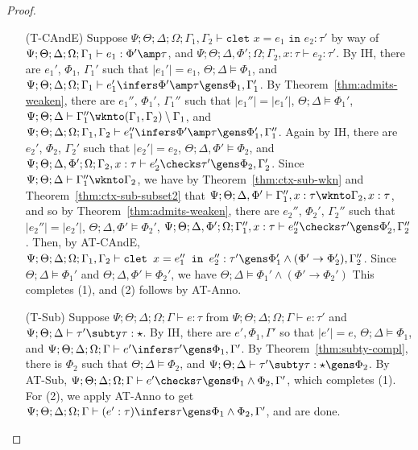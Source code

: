 \begin{proof}
\begin{itemize}
  \item[(T-CAndE)] Suppose
  $\Psi ; \Theta ; \Delta ; \Omega ; \Gamma_1,\Gamma_2 \vdash \texttt{clet } x = e_1 \texttt{ in } e_2 : \tau'$ by way of
  $\Psi ; \Theta ; \Delta ; \Omega ; \Gamma_1 \vdash e_1 : \Phi' \amp \tau$, and
  $\Psi ; \Theta ; \Delta, \Phi' ; \Omega ; \Gamma_2, x : \tau \vdash e_2 : \tau'$.
  By IH, there are $e_1'$, $\Phi_1$, $\Gamma_1'$ such that
  $|e_1'| = e_1$,
  $\Theta ; \Delta \vDash \Phi_1$, and
  $\Psi ; \Theta ; \Delta ; \Omega ; \Gamma_1 \vdash e_1' \infers \Phi' \amp \tau \gens \Phi_1,\Gamma_1'$.
  By Theorem~\ref{thm:admits-weaken}, there are $e_1''$, $\Phi_1'$, $\Gamma_1''$ such that
  $|e_1''| = |e_1'|$,
  $\Theta ; \Delta \vDash \Phi_1'$,
  $\Psi ; \Theta ; \Delta \vdash \Gamma_1'' \wknto (\Gamma_1,\Gamma_2) \setminus \Gamma_1$, and
  $\Psi ; \Theta ; \Delta ; \Omega ; \Gamma_1,\Gamma_2 \vdash e_1'' \infers \Phi' \amp \tau \gens \Phi_1',\Gamma_1''$.
  Again by IH, there are $e_2'$, $\Phi_2$, $\Gamma_2'$ such that
  $|e_2'| = e_2$,
  $\Theta ; \Delta,\Phi' \vDash \Phi_2$, and
  $\Psi ; \Theta ; \Delta,\Phi' ; \Omega ; \Gamma_2,x : \tau \vdash e_2' \checks \tau' \gens \Phi_2,\Gamma_2'$.
  Since
  $\Psi ; \Theta ; \Delta \vdash \Gamma_1'' \wknto \Gamma_2$, we have by Theorem~\ref{thm:ctx-sub-wkn} and Theorem~\ref{thm:ctx-sub-subset2}
  that
  $\Psi ; \Theta ; \Delta,\Phi' \vdash \Gamma_1'',x : \tau \wknto \Gamma_2,x : \tau$,
  and so by Theorem~\ref{thm:admits-weaken}, there are $e_2''$, $\Phi_2'$, $\Gamma_2''$ such that
  $|e_2''| = |e_2'|$,
  $\Theta ; \Delta, \Phi' \vDash \Phi_2'$,
  $\Psi ; \Theta ; \Delta, \Phi' ; \Omega ;\Gamma_1'',x:\tau \vdash e_2'' \checks \tau' \gens \Phi_2',\Gamma_2''$.
  Then, by AT-CAndE,
  $\Psi ; \Theta ; \Delta ; \Omega ; \Gamma_1,\Gamma_2 \vdash \texttt{clet } x = e_1'' \texttt{ in } e_2'' : \tau' \gens \Phi_1' \wedge (\Phi' \to \Phi_2'),\Gamma_2''$.
  Since $\Theta ; \Delta \vDash \Phi_1'$ and $\Theta ; \Delta, \Phi' \vDash \Phi_2'$,
  we have $\Theta ; \Delta \vDash \Phi_1' \wedge (\Phi' \to \Phi_2')$
  This completes (1), and (2) follows by AT-Anno.
  
  \item[(T-Sub)] Suppose $\Psi ; \Theta ; \Delta ; \Omega ; \Gamma \vdash e : \tau$ from $\Psi ; \Theta ; \Delta ; \Omega ; \Gamma \vdash e : \tau'$ and $\Psi;\Theta;\Delta \vdash \tau' \subty \tau : \star$. By IH, there are $e',\Phi_1,\Gamma'$ so that $|e'| = e$, $\Theta ; \Delta \vDash \Phi_1$, and $\Psi ; \Theta ; \Delta ; \Omega ; \Gamma \vdash e' \infers \tau' \gens \Phi_1,\Gamma'$. By Theorem~\ref{thm:subty-compl}, there is $\Phi_2$ such that $\Theta ; \Delta \vDash \Phi_2$, and $\Psi ; \Theta ; \Delta \vdash \tau' \subty \tau : \star \gens \Phi_2$. By AT-Sub, $\Psi ; \Theta ; \Delta ; \Omega ; \Gamma \vdash e' \checks \tau \gens \Phi_1 \wedge \Phi_2,\Gamma'$, which completes (1). For (2), we apply AT-Anno to get $\Psi ; \Theta ; \Delta ; \Omega ; \Gamma \vdash (e' : \tau) \infers \tau \gens \Phi_1 \wedge \Phi_2,\Gamma'$, and are done.
  

\end{itemize}
\end{proof}
